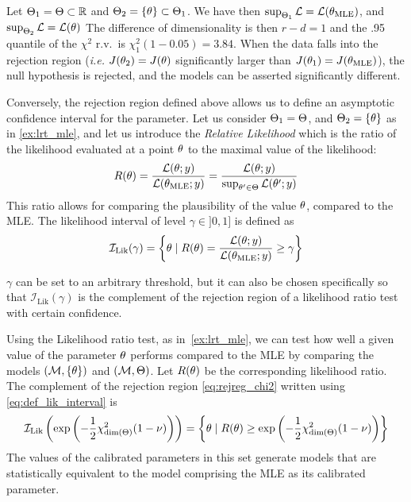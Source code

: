 \documentclass[../../Main_ManuscritThese.tex]{subfiles}
\begin{document}
\begin{example}
  \label{ex:lrt_mle}
  Let $\Theta_1 = \Theta\subset \mathbb{R}$ and
  $\Theta_2 = \{\theta\}\subset \Theta_1$.  We have then
  $\sup_{\Theta_1} \mathcal{L} = \mathcal{L}({\theta}_{\mathrm{MLE}})$,
  and $\sup_{\Theta_2} \mathcal{L} = \mathcal{L}(\theta)$ The difference
  of dimensionality is then $r-d=1$ and the .95 quantile of the
  $\chi^2$ r.v.\ is $\chi^2_1(1-0.05) =3.84$. When the data falls into
  the rejection region (\emph{i.e.} $J(\theta_2)=J(\theta)$ significantly larger
  than $J({\theta}_1)=J(\theta_{\mathrm{MLE}})$), the null hypothesis is rejected, and the models
  can be asserted significantly different.
\end{example}



\label{sec:relative_likelihood}
Conversely, the rejection region defined above allows us to define an asymptotic confidence interval for the parameter. Let us consider $\Theta_1 = \Theta$, and $\Theta_2 = \{\theta\}$ as in \cref{ex:lrt_mle}, and let us introduce the \emph{Relative Likelihood} \citep{kalbfleisch_probability_1985} which is the ratio of the likelihood evaluated at a point $\theta$ to the maximal value of the likelihood:
\begin{equation}
  R(\theta) = \frac{\mathcal{L}(\theta;y)}{\mathcal{L}({\theta}_{\mathrm{MLE}};y)} = \frac{\mathcal{L}(\theta;y)}{\sup_{\theta^{\prime} \in \Theta}\mathcal{L}(\theta^{\prime};y)}
\end{equation}
This ratio allows for comparing the plausibility of the value $\theta$, compared to the MLE.
The likelihood interval of level $\gamma\in ]0,1]$ is defined as
\begin{equation}
  \label{eq:def_lik_interval}
  \mathcal{I}_{\mathrm{Lik}}(\gamma) = \left\{\theta \mid R(\theta)=\frac{\mathcal{L}(\theta;y)}{\mathcal{L}({\theta}_{\mathrm{MLE}};y)} \geq \gamma\right\}
\end{equation}

$\gamma$ can be set to an arbitrary threshold, but it can also be chosen
specifically so that $\mathcal{I}_{\mathrm{Lik}}(\gamma)$ is the complement
of the rejection region of a likelihood ratio test with certain
confidence.

Using the Likelihood ratio test, as in~\cref{ex:lrt_mle}, we can test
how well a given value of the parameter $\theta$ performs compared to the
MLE by comparing the models $(\mathcal{M}, \{\theta\})$ and
$(\mathcal{M},\Theta)$. Let $R(\theta)$ be the corresponding likelihood
ratio. The complement of the rejection region \cref{eq:rejreg_chi2}
written using \cref{eq:def_lik_interval} is
\begin{equation}
  \label{eq:rel_lik_threshold}
  \mathcal{I}_{\mathrm{Lik}}\left(\exp\left(-\frac{1}{2}\chi^2_{\mathrm{dim}(\Theta)}(1-\nu)\right)\right) = \left\{\theta \mid R(\theta) \geq \exp\left(-\frac{1}{2}\chi^2_{\mathrm{dim}(\Theta)}(1-\nu)\right) \right\}
\end{equation}
The values of the calibrated parameters in this set generate models
that are statistically equivalent to the model comprising the MLE as
its calibrated parameter.
\end{document}
